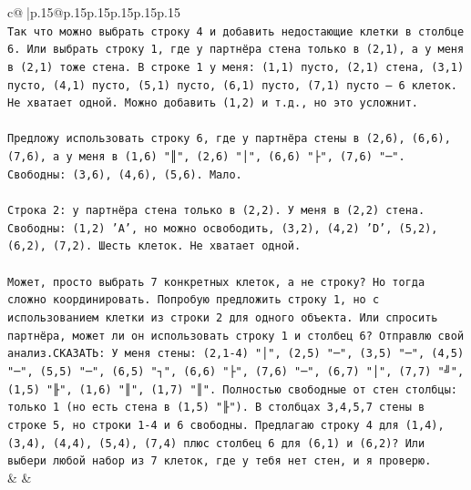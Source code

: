 \documentclass{article}
\begin{document}
{\begin{supertabular}{c@{$\;$}|p{.15\linewidth}@{}p{.15\linewidth}p{.15\linewidth}p{.15\linewidth}p{.15\linewidth}p{.15\linewidth}}
{{{\\ 
\texttt{Так что можно выбрать строку 4 и добавить недостающие клетки в столбце 6. Или выбрать строку 1, где у партнёра стена только в (2,1), а у меня в (2,1) тоже стена. В строке 1 у меня: (1,1) пусто, (2,1) стена, (3,1) пусто, (4,1) пусто, (5,1) пусто, (6,1) пусто, (7,1) пусто — 6 клеток. Не хватает одной. Можно добавить (1,2) и т.д., но это усложнит.} \\
\\ 
\texttt{Предложу использовать строку 6, где у партнёра стены в (2,6), (6,6), (7,6), а у меня в (1,6) "║", (2,6) "│", (6,6) "├", (7,6) "─". Свободны: (3,6), (4,6), (5,6). Мало.} \\
\\ 
\texttt{Строка 2: у партнёра стена только в (2,2). У меня в (2,2) стена. Свободны: (1,2) 'A', но можно освободить, (3,2), (4,2) 'D', (5,2), (6,2), (7,2). Шесть клеток. Не хватает одной.} \\
\\ 
\texttt{Может, просто выбрать 7 конкретных клеток, а не строку? Но тогда сложно координировать. Попробую предложить строку 1, но с использованием клетки из строки 2 для одного объекта. Или спросить партнёра, может ли он использовать строку 1 и столбец 6? Отправлю свой анализ.СКАЗАТЬ: У меня стены: (2,1{-}4) "│", (2,5) "─", (3,5) "─", (4,5) "─", (5,5) "─", (6,5) "┐", (6,6) "├", (7,6) "─", (6,7) "│", (7,7) "╝", (1,5) "╟", (1,6) "║", (1,7) "║". Полностью свободные от стен столбцы: только 1 (но есть стена в (1,5) "╟"). В столбцах 3,4,5,7 стены в строке 5, но строки 1{-}4 и 6 свободны. Предлагаю строку 4 для (1,4), (3,4), (4,4), (5,4), (7,4) плюс столбец 6 для (6,1) и (6,2)? Или выбери любой набор из 7 клеток, где у тебя нет стен, и я проверю.} \\
            }
        }
    }
    & & \\ \\


\end{supertabular}}
\end{document}
